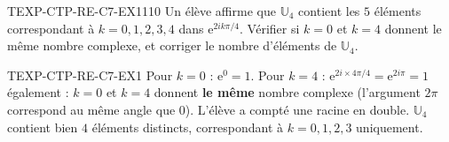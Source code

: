 

\begin{exercice}{TEXP-CTP-RE-C7-EX1}{1}{10}
Un élève affirme que $\mathbb{U}_4$ contient les $5$ éléments correspondant à $k=0,1,2,3,4$ dans $\mathrm{e}^{2ik\pi/4}$. Vérifier si $k=0$ et $k=4$ donnent le même nombre complexe, et corriger le nombre d'éléments de $\mathbb{U}_4$.
\end{exercice}


\begin{corrige}{TEXP-CTP-RE-C7-EX1}
Pour $k=0$ : $\mathrm{e}^{0}=1$. Pour $k=4$ : $\mathrm{e}^{2i\times4\pi/4}=\mathrm{e}^{2i\pi}=1$ également : $k=0$ et $k=4$ donnent \textbf{le même} nombre complexe (l'argument $2\pi$ correspond au même angle que $0$). L'élève a compté une racine en double. $\mathbb{U}_4$ contient bien $4$ éléments distincts, correspondant à $k=0,1,2,3$ uniquement.
\end{corrige}
